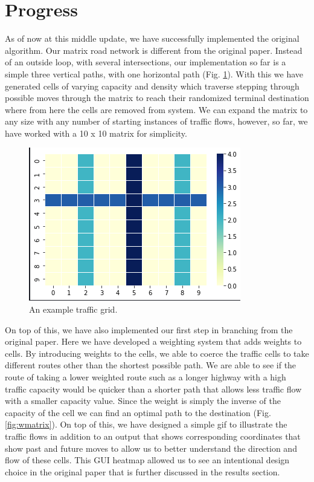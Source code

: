 \documentclass[sigplan,screen]{acmart}
\begin{document}
\section{Progress}
As of now at this middle update, we have successfully implemented the original
algorithm. Our matrix road network is different from the original paper. Instead
of an outside loop, with several intersections, our implementation so far is a
simple three vertical paths, with one horizontal path (Fig. \ref{fig:cmatrix}).
With this we have generated cells of varying capacity and density which traverse
stepping through possible moves through the matrix to reach their randomized
terminal destination where from here the cells are removed from system. We can
expand the matrix to any size with any number of starting instances of traffic
flows, however, so far, we have worked with a 10 x 10 matrix for simplicity.

\begin{figure}[h]
    \centering
    \includegraphics[width=\columnwidth]{assets/cmatrix.png}
    \caption{An example traffic grid.}
    \label{fig:cmatrix}
\end{figure}

On top of this, we have also implemented our first step in branching from the
original paper. Here we have developed a weighting system that adds weights to
cells. By introducing weights to the cells, we able to coerce the traffic cells
to take different routes other than the shortest possible path. We are able to
see if the route of taking a lower weighted route such as a longer highway with
a high traffic capacity would be quicker than a shorter path that allows less
traffic flow with a smaller capacity value. Since the weight is simply the
inverse of the capacity of the cell we can find an optimal path to the
destination (Fig. \ref{fig:wmatrix}). On top of this, we have designed a simple
gif to illustrate the traffic flows in addition to an output that shows
corresponding coordinates that show past and future moves to allow us to better
understand the direction and flow of these cells. This GUI heatmap allowed us to
see an intentional design choice in the original paper that is further discussed
in the results section.
\end{document}
